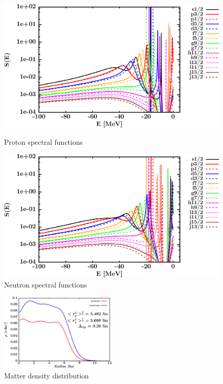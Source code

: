 \begin{figure}[H]
    \centering
    \begin{minipage}{0.45\textwidth}
        \centering
        \includegraphics[width=1.0\textwidth]{figures/pb208_protonSpectralFunctions.png}
        \caption{Proton spectral functions}
        \label{DOMFitData_pb208_proton_spectralFunctions}
    \end{minipage}\hfill
    \begin{minipage}{0.45\textwidth}
        \centering
        \includegraphics[width=1.0\textwidth]{figures/pb208_neutronSpectralFunctions.png}
        \caption{Neutron spectral functions}
        \label{DOMFitData_pb208_neutron_spectralFunctions}
    \end{minipage}
\end{figure}

\begin{figure}[H]
    \centering
    \includegraphics[width = 0.5\textwidth]{figures/pb208_matterDensity.png}
    \caption{Matter density distribution}
    \label{DOMFitData_pb208_matterDensity}
\end{figure}

